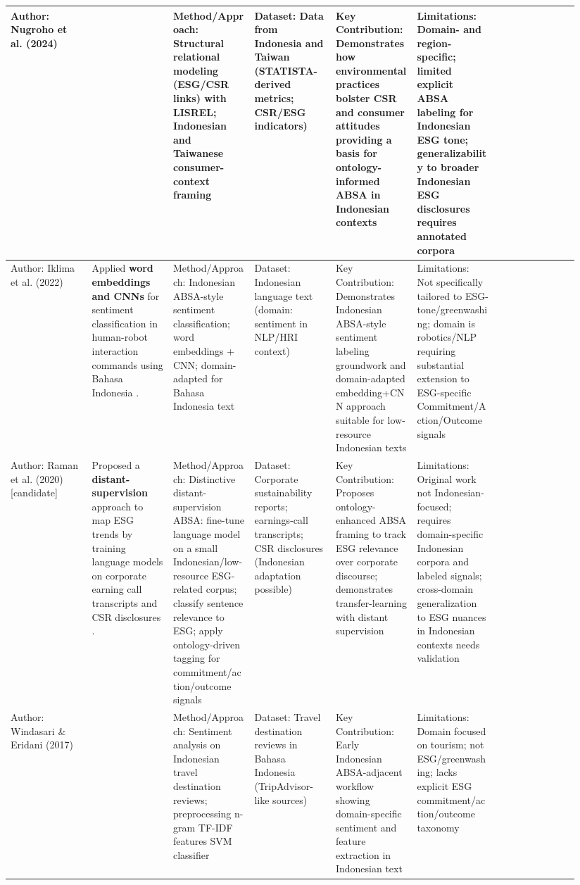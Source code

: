 \documentclass{article}
\begin{document}
\begin{landscape}
\begin{longtable}{p{0.134\linewidth} p{0.134\linewidth} p{0.134\linewidth} p{0.134\linewidth} p{0.134\linewidth} p{0.134\linewidth} p{0.134\linewidth}}
Author: Nugroho et al. (2024) & ~ & Method/Approach: Structural relational modeling (ESG/CSR links) with LISREL; Indonesian and Taiwanese consumer-context framing & Dataset: Data from Indonesia and Taiwan (STATISTA-derived metrics; CSR/ESG indicators) & Key Contribution: Demonstrates how environmental practices bolster CSR and consumer attitudes providing a basis for ontology-informed ABSA in Indonesian contexts & Limitations: Domain- and region-specific; limited explicit ABSA labeling for Indonesian ESG tone; generalizability to broader Indonesian ESG disclosures requires annotated corpora \\ \hline
Author: Iklima et al. (2022) & Applied \textbf{word embeddings and CNNs} for sentiment classification in human-robot interaction commands using Bahasa Indonesia  \parencite{zendi_iklima_1f26ebf3}. & Method/Approach: Indonesian ABSA-style sentiment classification; word embeddings + CNN; domain-adapted for Bahasa Indonesia text & Dataset: Indonesian language text (domain: sentiment in NLP/HRI context) & Key Contribution: Demonstrates Indonesian ABSA-style sentiment labeling groundwork and domain-adapted embedding+CNN approach suitable for low-resource Indonesian texts & Limitations: Not specifically tailored to ESG-tone/greenwashing; domain is robotics/NLP requiring substantial extension to ESG-specific Commitment/Action/Outcome signals \\ \hline
Author: Raman et al. (2020) [candidate] & Proposed a \textbf{distant-supervision} approach to map ESG trends by training language models on corporate earning call transcripts and CSR disclosures  \parencite{natraj_raman_009776f2}. & Method/Approach: Distinctive distant-supervision ABSA: fine-tune language model on a small Indonesian/low-resource ESG-related corpus; classify sentence relevance to ESG; apply ontology-driven tagging for commitment/action/outcome signals & Dataset: Corporate sustainability reports; earnings-call transcripts; CSR disclosures (Indonesian adaptation possible) & Key Contribution: Proposes ontology-enhanced ABSA framing to track ESG relevance over corporate discourse; demonstrates transfer-learning with distant supervision & Limitations: Original work not Indonesian-focused; requires domain-specific Indonesian corpora and labeled signals; cross-domain generalization to ESG nuances in Indonesian contexts needs validation \\ \hline
Author: Windasari \& Eridani (2017) & ~ & Method/Approach: Sentiment analysis on Indonesian travel destination reviews; preprocessing n-gram TF-IDF features SVM classifier & Dataset: Travel destination reviews in Bahasa Indonesia (TripAdvisor-like sources) & Key Contribution: Early Indonesian ABSA-adjacent workflow showing domain-specific sentiment and feature extraction in Indonesian text & Limitations: Domain focused on tourism; not ESG/greenwashing; lacks explicit ESG commitment/action/outcome taxonomy \\ \hline

\end{longtable}
\end{landscape}
\end{document}
